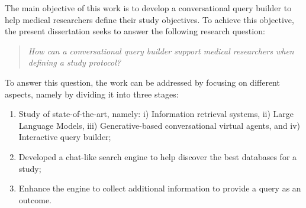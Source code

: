The main objective of this work is to develop a conversational query builder to help medical researchers define their study objectives. To achieve this objective, the present dissertation seeks to answer the following research question:

\begin{quote}
    \small\textit{How can a conversational query builder support medical researchers when defining a study protocol?}
\end{quote}

To answer this question, the work can be addressed by focusing on different aspects, namely by dividing it into three stages:

\begin{enumerate}
    \item Study of state-of-the-art, namely: i) Information retrieval systems, ii) Large Language Models, iii) Generative-based conversational virtual agents, and iv) Interactive query builder;
    \item Developed a chat-like search engine to help discover the best databases for a study;
    \item Enhance the engine to collect additional information to provide a query as an outcome. 
\end{enumerate}




